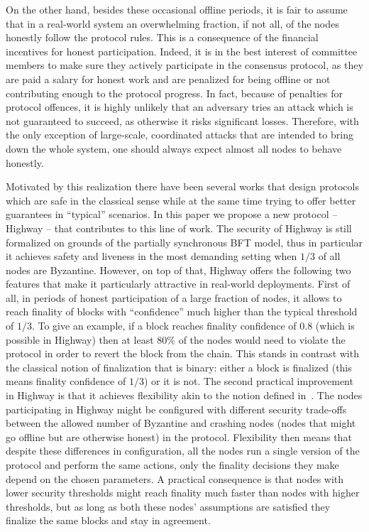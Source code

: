 \documentclass[12pt, fleqn]{article}
\begin{document}
On the other hand, besides these occasional offline periods, it is fair to assume that in a real-world system an overwhelming fraction, if not all, of the nodes honestly follow the protocol rules.
%
This is a consequence of the financial incentives for honest participation.
%
Indeed, it is in the best interest of committee members to make sure they actively participate in the consensus protocol, as they are paid a salary for honest work and are penalized for being offline or not contributing enough to the protocol progress.
%
In fact, because of penalties for protocol offences, it is highly unlikely that an adversary tries an attack which is not guaranteed to succeed, as otherwise it risks significant losses.
%
Therefore, with the only exception of large-scale, coordinated attacks that are intended to bring down the whole system, one should always expect almost all nodes to behave honestly.

Motivated by this realization there have been several works that design protocols which are safe in the classical sense while at the same time trying to offer better guarantees in ``typical'' scenarios.
%
In this paper we propose a new protocol -- Highway -- that contributes to this line of work.
%
The security of Highway is still formalized on grounds of the partially synchronous BFT model, thus in particular it achieves safety and liveness in the most demanding setting when $1/3$ of all nodes are Byzantine.
%
However, on top of that, Highway offers the following two features that make it particularly attractive in real-world deployments.
%
First of all, in periods of honest participation of a large fraction of nodes, it allows to reach finality of blocks with ``confidence'' much higher than the typical threshold of $1/3$.
To give an example, if a block reaches finality confidence of $0.8$ (which is possible in Highway) then at least $80\%$ of the nodes would need to violate the protocol in order to revert the block from the chain.
%
This stands in contrast with the classical notion of finalization that is binary: either a block is finalized (this means finality confidence of $1/3$) or it is not.
%
The second practical improvement in Highway is that it achieves flexibility akin to the notion defined in~\cite{MNR19}.
%
The nodes participating in Highway might be configured with different security trade-offs between the allowed number of Byzantine and crashing nodes (nodes that might go offline but are otherwise honest) in the protocol.
%
Flexibility then means that despite these differences in configuration, all the nodes run a single version of the protocol and perform the same actions, only the finality decisions they make depend on the chosen parameters.
%
A practical consequence is that nodes with lower security thresholds might reach finality much faster than nodes with higher thresholds, but as long as both these nodes' assumptions are satisfied they finalize the same blocks and stay in agreement.
    
\end{document}
